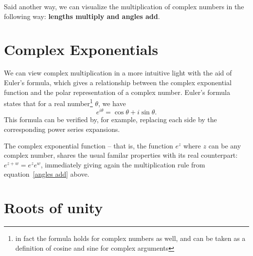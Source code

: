 \documentclass[12pt]{report}
\theoremstyle{plain}
\begin{document}
Said another way, we can visualize the multiplication of complex numbers in the following way: \textbf{lengths multiply and angles add}.

\section{Complex Exponentials} \label{complex exponentials}

We can view complex multiplication in a more intuitive light with the aid of Euler's formula, which gives a relationship between the complex exponential function and the polar representation of a complex number. Euler's formula states that for a real number\footnote{in fact the formula holds for complex numbers as well, and can be taken as a definition of cosine and sine for complex arguments} $\theta$, we have
\[e^{i \theta} = \cos \theta + i \sin \theta. \]
This formula can be verified by, for example, replacing each side by the corresponding power series expansions.

The complex exponential function -- that is, the function $e^z$ where $z$ can be any complex number, shares the usual familar properties with its real counterpart: $e^{z + w} = e^z e^w$, immediately giving again the multiplication rule from equation~\ref{angles add} above.

\iffalse
Let's visualize how the graph of the function $e^{i \theta}$ as a function of the real variable $\theta$. 
\fi

\iffalse
Given a complex number, expressed as \[z = r \cos \theta + i r \sin \theta,\] we see that we can raise $z$ to positive integer powers by the formula
\[z^n = r^n \cos n\theta + i r^n \sin n\theta.\]
In particular, it makes sense to extend this definition and simply define the exponential $z^s$ for any real number $s$, by the formula
\[z^s = r^s \cos s\theta + i r^s \sin s\theta\]
\fi

\section{Roots of unity}

%
%
\printindex
\end{document}
